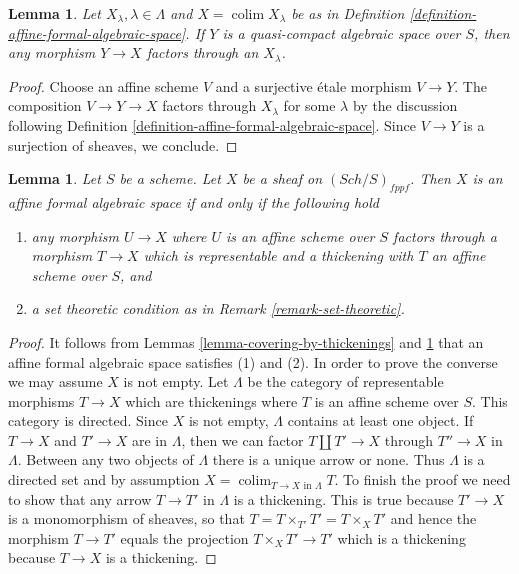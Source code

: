 \documentclass{stacks-project}
\theoremstyle{plain}
\newtheorem{lemma}[subsection]{Lemma}
\theoremstyle{definition}
\theoremstyle{remark}
\numberwithin{equation}{subsection}
\def\colim{\mathop{\mathrm{colim}}\nolimits}
\def\Sch{\mathit{Sch}}
\begin{document}
\begin{lemma}
\label{lemma-factor-through-thickening}
Let $X_\lambda, \lambda \in \Lambda$ and $X = \colim X_\lambda$
be as in Definition \ref{definition-affine-formal-algebraic-space}.
If $Y$ is a quasi-compact algebraic space over $S$, then any
morphism $Y \to X$ factors through an $X_\lambda$.
\end{lemma}

\begin{proof}
Choose an affine scheme $V$ and a surjective \'etale morphism
$V \to Y$. The composition $V \to Y \to X$ factors through
$X_\lambda$ for some $\lambda$ by the discussion following
Definition \ref{definition-affine-formal-algebraic-space}.
Since $V \to Y$ is a surjection of sheaves, we conclude.
\end{proof}

\begin{lemma}
\label{lemma-characterize-affine-formal-algebraic-space}
Let $S$ be a scheme. Let $X$ be a sheaf on $(\Sch/S)_{fppf}$.
Then $X$ is an affine formal algebraic space if and only if
the following hold
\begin{enumerate}
\item any morphism $U \to X$ where $U$ is an affine scheme over $S$
factors through a morphism $T \to X$ which is representable and a
thickening with $T$ an affine scheme over $S$, and
\item a set theoretic condition as in Remark \ref{remark-set-theoretic}.
\end{enumerate}
\end{lemma}

\begin{proof}
It follows from Lemmas \ref{lemma-covering-by-thickenings} and
\ref{lemma-factor-through-thickening} that an affine formal algebraic space
satisfies (1) and (2). In order to prove the converse we may
assume $X$ is not empty.
Let $\Lambda$ be the category of representable morphisms $T \to X$ which are
thickenings where $T$ is an affine scheme over $S$. This category
is directed. Since $X$ is not empty, $\Lambda$ contains at least one
object. If $T \to X$ and $T' \to X$ are in $\Lambda$, then we can
factor $T \amalg T' \to X$ through $T'' \to X$ in $\Lambda$. Between
any two objects of $\Lambda$ there is a unique arrow or none. Thus
$\Lambda$ is a directed set and by assumption
$X = \colim_{T \to X\text{ in }\Lambda} T$. To finish the proof
we need to show that any arrow $T \to T'$ in $\Lambda$ is a thickening.
This is true because $T' \to X$ is a monomorphism of sheaves, so that
$T = T \times_{T'} T' = T \times_X T'$ and hence the morphism
$T \to T'$ equals the projection $T \times_X T' \to T'$ which is
a thickening because $T \to X$ is a thickening.
\end{proof}
\end{document}
